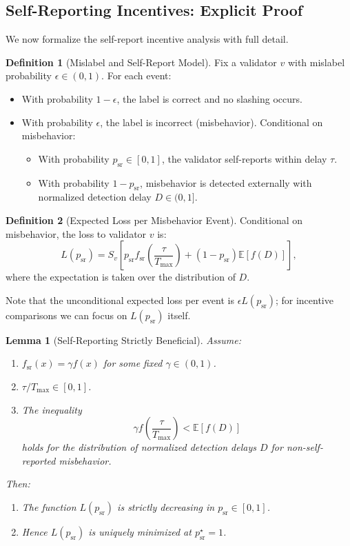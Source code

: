 \documentclass[11pt]{article}
\theoremstyle{plain}
\newtheorem{lemma}{Lemma}
\theoremstyle{definition}
\newtheorem{definition}{Definition}
\begin{document}
\subsection{Self-Reporting Incentives: Explicit Proof}

We now formalize the self-report incentive analysis with full detail.

\begin{definition}[Mislabel and Self-Report Model]
\label{def:mislabel-model}
Fix a validator \(v\) with mislabel probability \(\epsilon \in (0,1)\). For each event:
\begin{itemize}[leftmargin=*]
  \item With probability \(1-\epsilon\), the label is correct and no slashing occurs.
  \item With probability \(\epsilon\), the label is incorrect (misbehavior). Conditional on misbehavior:
  \begin{itemize}
    \item With probability \(p_{\mathrm{sr}} \in [0,1]\), the validator self-reports within delay \(\tau\).
    \item With probability \(1-p_{\mathrm{sr}}\), misbehavior is detected externally with normalized detection delay \(D \in (0,1]\).
  \end{itemize}
\end{itemize}
\end{definition}

\begin{definition}[Expected Loss per Misbehavior Event]
\label{def:loss}
Conditional on misbehavior, the loss to validator \(v\) is:
\[
L(p_{\mathrm{sr}})
= S_v\left[p_{\mathrm{sr}} f_{\mathrm{sr}}\!\left(\frac{\tau}{T_{\max}}\right)
  + (1-p_{\mathrm{sr}})\mathbb{E}[f(D)]\right],
\]
where the expectation is taken over the distribution of \(D\).
\end{definition}

Note that the unconditional expected loss per event is \(\epsilon L(p_{\mathrm{sr}})\); for incentive comparisons we can focus on \(L(p_{\mathrm{sr}})\) itself.

\begin{lemma}[Self-Reporting Strictly Beneficial]
\label{lem:self-report-app}
Assume:
\begin{enumerate}[leftmargin=*]
  \item \(f_{\mathrm{sr}}(x) = \gamma f(x)\) for some fixed \(\gamma \in (0,1)\).
  \item \(\tau/T_{\max} \in [0,1]\).
  \item The inequality
  \[
  \gamma f\!\left(\frac{\tau}{T_{\max}}\right) < \mathbb{E}[f(D)]
  \]
  holds for the distribution of normalized detection delays \(D\) for non-self-reported misbehavior.
\end{enumerate}
Then:
\begin{enumerate}[leftmargin=*]
  \item The function \(L(p_{\mathrm{sr}})\) is strictly decreasing in \(p_{\mathrm{sr}}\in[0,1]\).
  \item Hence \(L(p_{\mathrm{sr}})\) is uniquely minimized at \(p_{\mathrm{sr}}^\star = 1\).
\end{enumerate}
\end{lemma}
\end{document}
